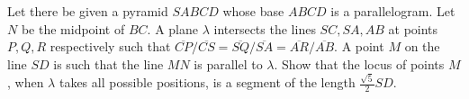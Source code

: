 Let there be given a pyramid $SABCD$ whose base $ABCD$ is a parallelogram. Let $N$ be the midpoint of $BC$. A plane $\lambda$ intersects the lines $SC,SA,AB$ at points $P,Q,R$ respectively such that $\overline{CP}/\overline{CS}=\overline{SQ}/\overline{SA}=\overline{AR}/\overline{AB}$. A point $M$ on the line $SD$ is such that the line $MN$ is parallel to $\lambda$. Show that the locus of points $M$, when $\lambda$ takes all possible positions, is a segment of the length $\frac{\sqrt5}2SD$.